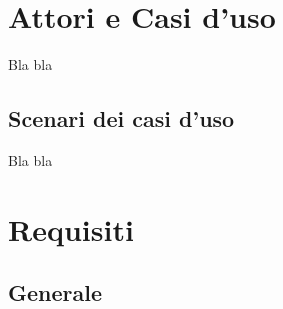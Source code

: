 \section{Attori e Casi d'uso}

Bla bla

\subsection{Scenari dei casi d'uso}

Bla bla

\section{Requisiti}

\subsection{Generale}

